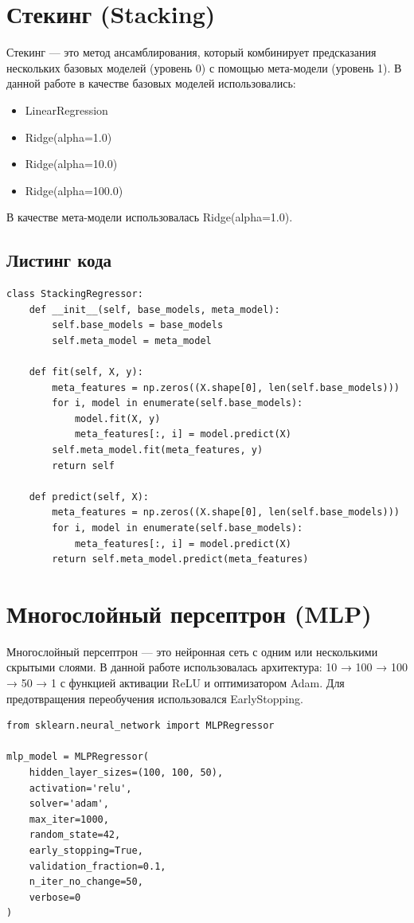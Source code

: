 \documentclass[a4paper,12pt]{article}
\begin{document}
\section*{Стекинг (Stacking)}

Стекинг — это метод ансамблирования, который комбинирует предсказания нескольких базовых моделей (уровень 0) с помощью мета-модели (уровень 1). В данной работе в качестве базовых моделей использовались:
\begin{itemize}
    \item LinearRegression
    \item Ridge(alpha=1.0)
    \item Ridge(alpha=10.0)
    \item Ridge(alpha=100.0)
\end{itemize}
В качестве мета-модели использовалась Ridge(alpha=1.0).

\subsection*{Листинг кода}
\begin{lstlisting}
class StackingRegressor:
    def __init__(self, base_models, meta_model):
        self.base_models = base_models
        self.meta_model = meta_model
    
    def fit(self, X, y):
        meta_features = np.zeros((X.shape[0], len(self.base_models)))
        for i, model in enumerate(self.base_models):
            model.fit(X, y)
            meta_features[:, i] = model.predict(X)
        self.meta_model.fit(meta_features, y)
        return self
    
    def predict(self, X):
        meta_features = np.zeros((X.shape[0], len(self.base_models)))
        for i, model in enumerate(self.base_models):
            meta_features[:, i] = model.predict(X)
        return self.meta_model.predict(meta_features)
\end{lstlisting}

\section*{Многослойный персептрон (MLP)}

Многослойный персептрон — это нейронная сеть с одним или несколькими скрытыми слоями. В данной работе использовалась архитектура: 10 → 100 → 100 → 50 → 1 с функцией активации ReLU и оптимизатором Adam. Для предотвращения переобучения использовался EarlyStopping.

\begin{lstlisting}
from sklearn.neural_network import MLPRegressor

mlp_model = MLPRegressor(
    hidden_layer_sizes=(100, 100, 50),
    activation='relu',
    solver='adam',
    max_iter=1000,
    random_state=42,
    early_stopping=True,
    validation_fraction=0.1,
    n_iter_no_change=50,
    verbose=0
)
\end{lstlisting}
\end{document}
